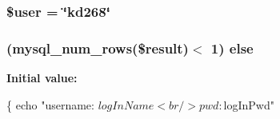 \hypertarget{_m_c_mlogin_validator_8php_a598ca4e71b15a1313ec95f0df1027ca5}{
\subsubsection[{\$user}]{\setlength{\rightskip}{0pt plus 5cm}\$user = \char`\"{}kd268\char`\"{}}}\label{_m_c_mlogin_validator_8php_a598ca4e71b15a1313ec95f0df1027ca5}
\hypertarget{_m_c_mlogin_validator_8php_acd73321adf3d3d588369f5341463f6d3}{
\subsubsection[{else}]{ (mysql\-\_\-num\-\_\-rows(\$result)$<$ 1) else}}\label{_m_c_mlogin_validator_8php_acd73321adf3d3d588369f5341463f6d3}
{\bfseries Initial value\-:}
\begin{DoxyCode}
\{
        echo \textcolor{stringliteral}{"username: $logInName <br/> pwd: $logInPwd"}
\end{DoxyCode}

